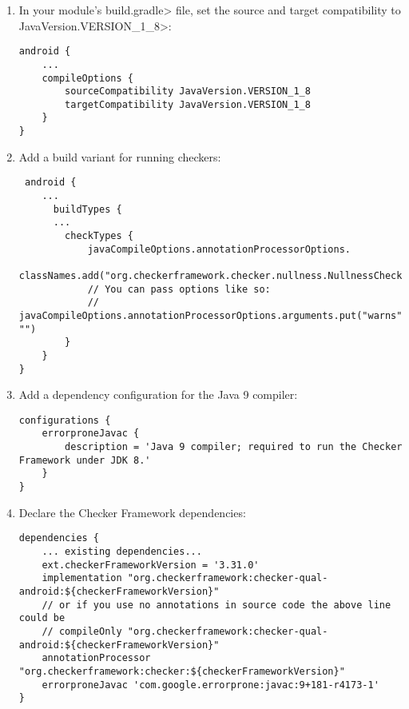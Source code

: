 \begin{enumerate}

\item In your module's \<build.gradle> file, set the source and target
  compatibility to \<JavaVersion.VERSION\_1\_8>:

\begin{Verbatim}
android {
    ...
    compileOptions {
        sourceCompatibility JavaVersion.VERSION_1_8
        targetCompatibility JavaVersion.VERSION_1_8
    }
}
\end{Verbatim}

\item Add a build variant for running checkers:

 \begin{Verbatim}
 android {
    ...
      buildTypes {
      ...
        checkTypes {
            javaCompileOptions.annotationProcessorOptions.
                    classNames.add("org.checkerframework.checker.nullness.NullnessChecker")
            // You can pass options like so:
            // javaCompileOptions.annotationProcessorOptions.arguments.put("warns", "")
        }
    }
}
\end{Verbatim}

\item Add a dependency configuration for the Java 9 compiler:

\begin{mysmall}
\begin{Verbatim}
configurations {
    errorproneJavac {
        description = 'Java 9 compiler; required to run the Checker Framework under JDK 8.'
    }
}

\end{Verbatim}
\end{mysmall}

\item Declare the Checker Framework dependencies:

\begin{mysmall}
\begin{Verbatim}
dependencies {
    ... existing dependencies...
    ext.checkerFrameworkVersion = '3.31.0'
    implementation "org.checkerframework:checker-qual-android:${checkerFrameworkVersion}"
    // or if you use no annotations in source code the above line could be
    // compileOnly "org.checkerframework:checker-qual-android:${checkerFrameworkVersion}"
    annotationProcessor "org.checkerframework:checker:${checkerFrameworkVersion}"
    errorproneJavac 'com.google.errorprone:javac:9+181-r4173-1'
}
\end{Verbatim}
\end{mysmall}


\end{enumerate}
